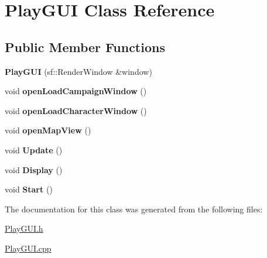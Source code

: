 \hypertarget{class_play_g_u_i}{}\section{Play\+G\+UI Class Reference}
\label{class_play_g_u_i}
\subsection*{Public Member Functions}
\begin{DoxyCompactItemize}
\item 
\hypertarget{class_play_g_u_i_affa959c79f69de91745f770ea2f57a95}{}\label{class_play_g_u_i_affa959c79f69de91745f770ea2f57a95} 
{\bfseries Play\+G\+UI} (sf\+::\+Render\+Window \&window)
\item 
\hypertarget{class_play_g_u_i_aa8e186a6e54bb6ca90cfc6f8b3998ea5}{}\label{class_play_g_u_i_aa8e186a6e54bb6ca90cfc6f8b3998ea5} 
void {\bfseries open\+Load\+Campaign\+Window} ()
\item 
\hypertarget{class_play_g_u_i_a4e67c64926638db74232eb1b529c5be1}{}\label{class_play_g_u_i_a4e67c64926638db74232eb1b529c5be1} 
void {\bfseries open\+Load\+Character\+Window} ()
\item 
\hypertarget{class_play_g_u_i_a2f8eb016e8db7d518eea79686197594c}{}\label{class_play_g_u_i_a2f8eb016e8db7d518eea79686197594c} 
void {\bfseries open\+Map\+View} ()
\item 
\hypertarget{class_play_g_u_i_a6fea8bd3bd17cf9ab51a980819ce65d1}{}\label{class_play_g_u_i_a6fea8bd3bd17cf9ab51a980819ce65d1} 
void {\bfseries Update} ()
\item 
\hypertarget{class_play_g_u_i_a223179fe171e8c98aead106007783c03}{}\label{class_play_g_u_i_a223179fe171e8c98aead106007783c03} 
void {\bfseries Display} ()
\item 
\hypertarget{class_play_g_u_i_aa0842eb3fdf4ca0cd8d6730049cb4cbb}{}\label{class_play_g_u_i_aa0842eb3fdf4ca0cd8d6730049cb4cbb} 
void {\bfseries Start} ()
\end{DoxyCompactItemize}


The documentation for this class was generated from the following files\+:\begin{DoxyCompactItemize}
\item 
\hyperlink{_play_g_u_i_8h}{Play\+G\+U\+I.\+h}\item 
\hyperlink{_play_g_u_i_8cpp}{Play\+G\+U\+I.\+cpp}\end{DoxyCompactItemize}
